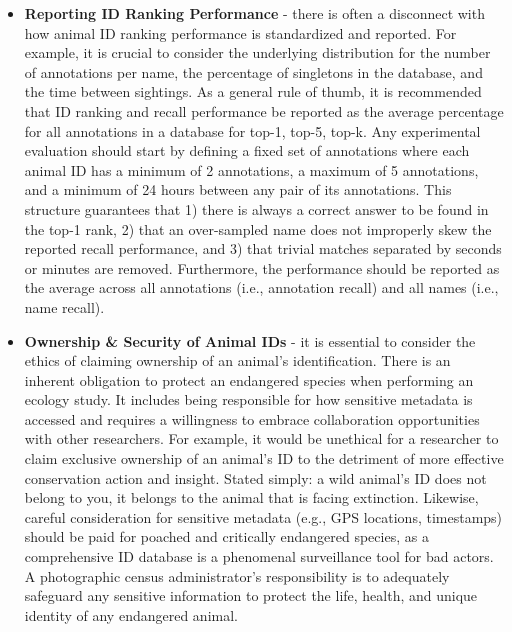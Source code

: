 \begin{itemize}
    \item \textbf{Reporting ID Ranking Performance} - there is often a disconnect with how animal ID ranking performance is standardized and reported.  For example, it is crucial to consider the underlying distribution for the number of annotations per name, the percentage of singletons in the database, and the time between sightings.  As a general rule of thumb, it is recommended that ID ranking and recall performance be reported as the average percentage for all annotations in a database for top-1, top-5, top-k.  Any experimental evaluation should start by defining a fixed set of annotations where each animal ID has a minimum of 2 annotations, a maximum of 5 annotations, and a minimum of 24 hours between any pair of its annotations.  This structure guarantees that 1) there is always a correct answer to be found in the top-1 rank, 2) that an over-sampled name does not improperly skew the reported recall performance, and 3) that trivial matches separated by seconds or minutes are removed.  Furthermore, the performance should be reported as the average across all annotations (i.e., annotation recall) and all names (i.e., name recall).
    \item \textbf{Ownership \& Security of Animal IDs} - it is essential to consider the ethics of claiming ownership of an animal's identification.  There is an inherent obligation to protect an endangered species when performing an ecology study. It includes being responsible for how sensitive metadata is accessed and requires a willingness to embrace collaboration opportunities with other researchers.  For example, it would be unethical for a researcher to claim exclusive ownership of an animal's ID to the detriment of more effective conservation action and insight.  Stated simply: a wild animal's ID does not belong to you, it belongs to the animal that is facing extinction.  Likewise, careful consideration for sensitive metadata (e.g., GPS locations, timestamps) should be paid for poached and critically endangered species, as a comprehensive ID database is a phenomenal surveillance tool for bad actors. A photographic census administrator's responsibility is to adequately safeguard any sensitive information to protect the life, health, and unique identity of any endangered animal.

\end{itemize}
